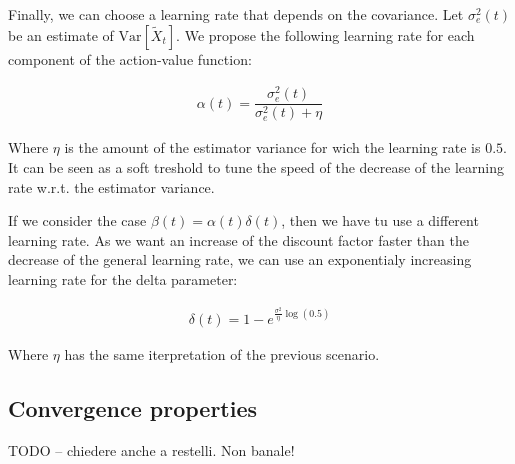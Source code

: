 \documentclass[conference]{IEEEtran}
\begin{document}
Finally, we can choose a learning rate that depends on the covariance. Let $\sigma_e^2(t)$ be an estimate of $\mathrm{Var}\left[\widetilde{X}_{t}\right]$. We propose the following learning rate for each component of the action-value function:

\begin{align}
 \alpha(t)=\dfrac{\sigma_e^2(t)}{\sigma_e^2(t)+\eta}
\end{align}

Where $\eta$ is the amount of the estimator variance for wich the learning rate is $0.5$. It can be seen as a soft treshold to tune the speed of the decrease of the learning rate w.r.t. the estimator variance.

If we consider the case $\beta(t)=\alpha(t)\delta(t)$, then we have tu use a different learning rate. As we want an increase of the discount factor faster than the decrease of the general learning rate, we can use an exponentialy increasing learning rate for the delta parameter:

\begin{align}
 \delta(t) = 1- e^{\frac{\sigma^2}{\eta}\log(0.5)}
\end{align}

Where $\eta$ has the same iterpretation of the previous scenario.


\subsection{Convergence properties}

TODO -- chiedere anche a restelli. Non banale!
\end{document}
